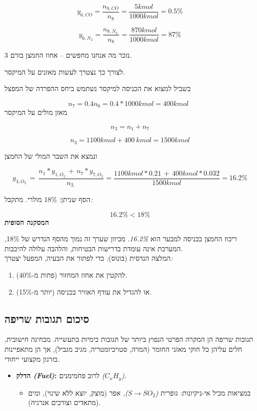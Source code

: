 \documentclass[
  hebrew,
  letterpaper,
  DIV=11,
  numbers=noendperiod]{scrreprt}
\providecommand{\tightlist}{%
  \setlength{\itemsep}{0pt}\setlength{\parskip}{0pt}}
\begin{document}
\[y_{6,CO} = \frac{n_{8,CO}}{n_{8}} = \frac{5kmol}{1000kmol} = 0.5\%\]

\[y_{6,N_{2}} = \frac{n_{8,N_{2}\ }}{n_{8}} = \frac{870kmol}{1000kmol} = 87\%\]

נזכר מה אנחנו מחפשים -- אחוז החמצן בזרם 3.

לצורך כך נצטרך לעשות מאזנים על המיקסר.

בשביל למצוא את הכניסה למיקסר נשתמש ביחס ההפרדה של המפצל

\[n_{7} = 0.4n_{6} = 0.4*1000kmol = 400kmol\ \ \] מאזן מולים על המיקסר

\[n_{3} = n_{1} + n_{7}\]

\[n_{3} = 1100kmol + 400\ kmol = 1500kmol\]

ונמצא את השבר המולי של החמצן

\[y_{3,O_{2}}\, = \,\frac{n_{1}*y_{1,O_{2}}\, + \, n_{7}*y_{7,O_{2}}}{n_{3,}} = \frac{1100kmol*0.21\, + \, 400kmol*0.032}{1500kmol} = 16.2\%\]

הסף שניתן: 18\% מולרי. מתקבל\emph{:}

\[16.2\% < 18\%\] \textbf{המסקנה הסופית}

ריכוז החמצן בכניסה למבער הוא \emph{16.2\%}. מכיוון שערך זה נמוך מהסף
הנדרש של 18\%, המערכת אינה עומדת בדרישות הבטיחות, והלהבה עלולה
להיכבות\emph{.}\\
המלצה הנדסית (בונוס)\emph{:} כדי לפתור את הבעיה, המפעל יצטרך\emph{:}

\begin{enumerate}
\def\labelenumi{\arabic{enumi}.}
\item
  להקטין את אחוז המחזור (פחות מ-40\%)\emph{.}
\item
  או להגדיל את עודף האוויר בכניסה (יותר מ-15\%)\emph{.}
\end{enumerate}

\subsection{סיכום תגובות
שריפה}\label{ux5e1ux5d9ux5dbux5d5ux5dd-ux5eaux5d2ux5d5ux5d1ux5d5ux5ea-ux5e9ux5e8ux5d9ux5e4ux5d4}

תגובות שריפה הן המקרה הפרטי הנפוץ ביותר של תגובות כימיות בתעשייה. מבחינה
חישובית, חלים עליהן כל חוקי מאזני החומר (המרה, סטויכיומטריה, מגיב
מגביל), אך הן מתאפיינות בז\textquotesingle רגון מקצועי ייחודי\emph{.}

\begin{itemize}
\item
  \textbf{הדלק \emph{(Fuel)}:} לרוב פחמימנים
  \emph{(}\(C_{x}H_{y}\)\emph{).}

  \begin{itemize}
  \tightlist
  \item
    במציאות מכיל אי-ניקיונות: גופרית
    \emph{(}\(S \rightarrow SO_{2}\)\emph{),} אפר (מוצק, יוצא ללא
    שינוי), ומים (מתאדים וצורכים אנרגיה).
  \end{itemize}
\end{itemize}
\end{document}
